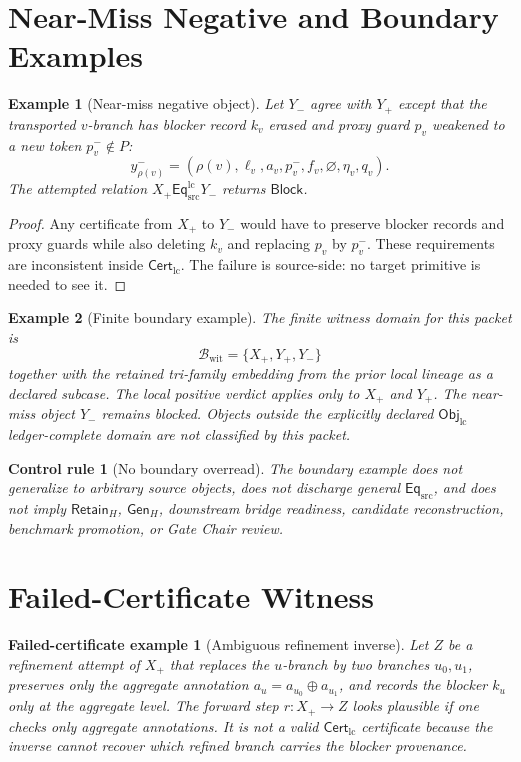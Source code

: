 \documentclass[11pt]{article}
\newcommand{\EqSrc}{\mathsf{Eq}_{\mathrm{src}}}
\newcommand{\EqLC}{\mathsf{Eq}_{\mathrm{src}}^{\mathrm{lc}}}
\newcommand{\ObjLC}{\mathsf{Obj}_{\mathrm{lc}}}
\newcommand{\CertLC}{\mathsf{Cert}_{\mathrm{lc}}}
\newcommand{\RetainH}{\mathsf{Retain}_{H}}
\newcommand{\GenH}{\mathsf{Gen}_{H}}
\newcommand{\Block}{\mathsf{Block}}
\newtheorem{examplecase}{Example}
\newtheorem{failedcase}{Failed-certificate example}
\newtheorem{controlrule}{Control rule}
\begin{document}
\section{Near-Miss Negative and Boundary Examples}

\begin{examplecase}[Near-miss negative object]
Let \(Y_-\) agree with \(Y_+\) except that the transported \(v\)-branch
has blocker record \(k_v\) erased and proxy guard \(p_v\) weakened to a
new token \(p_v^{-}\notin P\):
\[
    y_{\rho(v)}^-=(\rho(v),\ell_v,a_v,p_v^-,f_v,\varnothing,\eta_v,q_v).
\]
The attempted relation \(X_+\EqLC Y_-\) returns \(\Block\).
\end{examplecase}

\begin{proof}
Any certificate from \(X_+\) to \(Y_-\) would have to preserve blocker
records and proxy guards while also deleting \(k_v\) and replacing
\(p_v\) by \(p_v^{-}\). These requirements are inconsistent inside
\(\CertLC\). The failure is source-side: no target primitive is needed
to see it.
\end{proof}

\begin{examplecase}[Finite boundary example]
The finite witness domain for this packet is
\[
    \mathcal{B}_{\mathrm{wit}}=\{X_+,Y_+,Y_-\}
\]
together with the retained tri-family embedding from the prior local
lineage as a declared subcase. The local positive verdict applies only
to \(X_+\) and \(Y_+\). The near-miss object \(Y_-\) remains blocked.
Objects outside the explicitly declared \(\ObjLC\) ledger-complete
domain are not classified by this packet.
\end{examplecase}

\begin{controlrule}[No boundary overread]
The boundary example does not generalize to arbitrary source objects,
does not discharge general \(\EqSrc\), and does not imply
\(\RetainH\), \(\GenH\), downstream bridge readiness, candidate
reconstruction, benchmark promotion, or Gate Chair review.
\end{controlrule}

\section{Failed-Certificate Witness}

\begin{failedcase}[Ambiguous refinement inverse]
Let \(Z\) be a refinement attempt of \(X_+\) that replaces the
\(u\)-branch by two branches \(u_0,u_1\), preserves only the aggregate
annotation \(a_u=a_{u_0}\oplus a_{u_1}\), and records the blocker
\(k_u\) only at the aggregate level. The forward step \(r:X_+\to Z\)
looks plausible if one checks only aggregate annotations. It is not a
valid \(\CertLC\) certificate because the inverse cannot recover which
refined branch carries the blocker provenance.
\end{failedcase}
\end{document}
